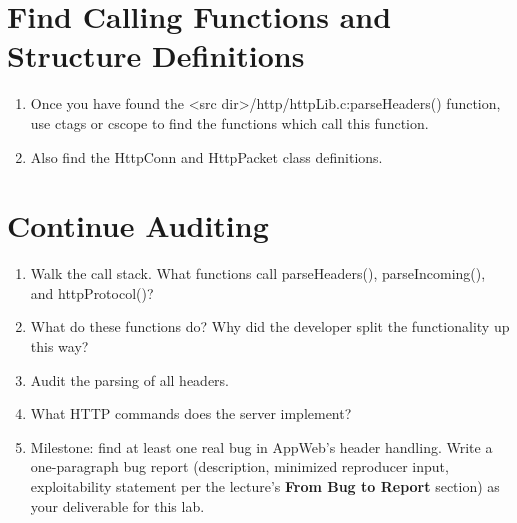 \documentclass[12pt]{Training}
\begin{document}
\section*{Find Calling Functions and Structure Definitions}
\begin{enumerate}
    \item Once you have found the <src dir>/http/httpLib.c:parseHeaders() function, use ctags or cscope to find the functions which call this function.
    \item Also find the HttpConn and HttpPacket class definitions.
\end{enumerate}

\section*{Continue Auditing}
\begin{enumerate}
    \item Walk the call stack. What functions call parseHeaders(), parseIncoming(), and httpProtocol()?
    \item What do these functions do? Why did the developer split the functionality up this way?
    \item Audit the parsing of all headers.
    \item What HTTP commands does the server implement?
    \item Milestone: find at least one real bug in AppWeb's header handling. Write a one-paragraph bug report (description, minimized reproducer input, exploitability statement per the lecture's \textbf{From Bug to Report} section) as your deliverable for this lab.
\end{enumerate}
\end{document}
